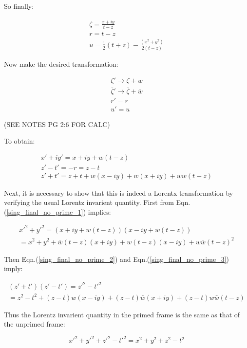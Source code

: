 \noindent So finally:

\begin{eqnarray*}
\zeta = \frac{x + i y}{t-z} \\
r = t - z \\
u = \frac{1}{2} (t + z) - \frac{(x^2 + y^2)}{2(t - z)}
\end{eqnarray*}

Now make the desired transformation:

\begin{eqnarray*}
\zeta' \rightarrow \zeta + w \\
\bar{\zeta}' \rightarrow \bar{\zeta} + \bar{w} \\
r' = r \\
u' = u
\end{eqnarray*}

(SEE NOTES PG 2:6 FOR CALC)

\noindent To obtain:

\begin{eqnarray}
x' + i y' = x + iy + w(t-z) \label{sing_final_no_prime_1} \\
z' - t' = -r = z - t \label{sing_final_no_prime_2} \\
z' + t' = z+t + w(x - i y) + w(x + iy) + w\bar{w} (t-z) \label{sing_final_no_prime_3}
\end{eqnarray}

Next, it is necessary to show that this is indeed a Lorentx transformation by verifying the usual Lorentz invarient quantity. First from Eqn.(\ref{sing_final_no_prime_1}) implies:

\begin{eqnarray*}
{x'}^2 + {y'}^2 = (x + iy + w(t-z))(x - iy + \bar{w}(t-z)) \\
= x^2 + y^2 + \bar{w}(t - z)(x+iy) + w(t-z)(x-iy) + w\bar{w}{(t-z)}^2
\end{eqnarray*}

Then Eqn.(\ref{sing_final_no_prime_2}) and Eqn.(\ref{sing_final_no_prime_3}) imply:

\begin{eqnarray*}
(z' + t')(z' - t') = {z'}^2 - {t'}^2 \\
= z^2 - t^2 + (z - t)w(x-iy) + (z-t)\bar{w}(x+iy) + (z -t)w\bar{w}(t-z)
\end{eqnarray*}

\noindent Thus the Lorentz invarient quantity in the primed frame is the same as that of the unprimed frame:

\begin{equation*} 
{x'}^2 + {y'}^2 + {z'}^2 - {t'}^2 = {x}^2 + {y}^2 + {z}^2 - {t}^2
\end{equation*} 

